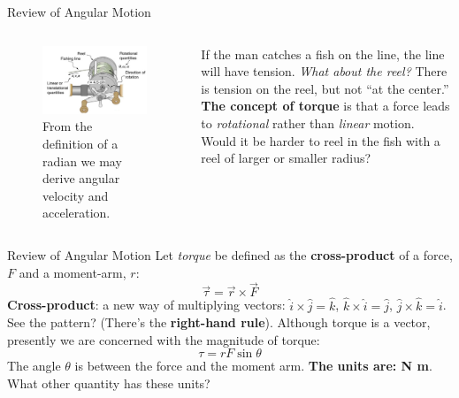 \documentclass{beamer}
\begin{document}
\begin{frame}{Review of Angular Motion}
\begin{columns}[T]
\begin{column}{0.5\textwidth}
\begin{figure}
\centering
\includegraphics[width=\textwidth]{figures/angle4.png}
\caption{\label{fig:angle5} From the definition of a radian we may derive angular velocity and acceleration.}
\end{figure}
\end{column}
\begin{column}{0.5\textwidth}
If the man catches a fish on the line, the line will have tension.  \textit{What about the reel?}  There is tension on the reel, but not ``at the center.'' \\ \vspace{0.5cm}
\textbf{The concept of torque} is that a force leads to \textit{rotational} rather than \textit{linear} motion.  \alert{Would it be harder to reel in the fish with a reel of larger or smaller radius?}
\end{column}
\end{columns}
\end{frame}

\begin{frame}{Review of Angular Motion}
Let \textit{torque} be defined as the \textbf{cross-product} of a force, $F$ and a moment-arm, $r$:
\begin{equation}
\vec{\tau} = \vec{r} \times \vec{F}
\end{equation}
\textbf{Cross-product}: a new way of multiplying vectors: $\hat{i} \times \hat{j} = \hat{k}$, $\hat{k} \times \hat{i} = \hat{j}$, $\hat{j} \times \hat{k} = \hat{i}$.  See the pattern?  (There's the \textbf{right-hand rule}).  Although torque is a vector, presently we are concerned with the magnitude of torque:
\begin{equation}
\tau = r F \sin\theta
\end{equation}
The angle $\theta$ is between the force and the moment arm.  \textbf{The units are: N m}.  What other quantity has these units?
\end{frame}
\end{document}

